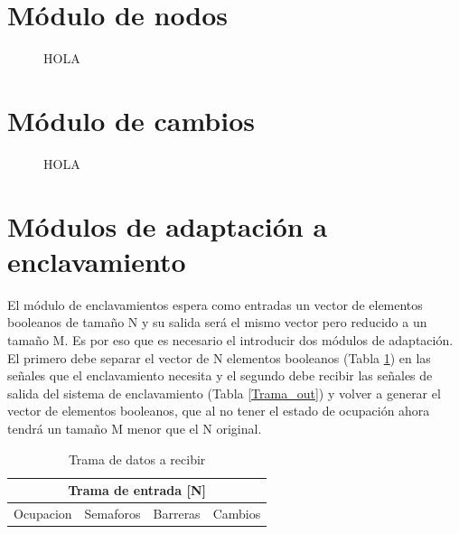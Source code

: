 \section{Módulo de nodos}

	\begin{figure}[h]
	\centering
		\caption{HOLA}
		\label{fig:hola}
	\end{figure}
	
\section{Módulo de cambios}

	\begin{figure}[h]
	\centering
		\caption{HOLA}
		\label{fig:hola}
	\end{figure}
	
%
	
\section{Módulos de adaptación a enclavamiento}

	El módulo de enclavamientos espera como entradas un vector de elementos booleanos de tamaño N y su salida será el mismo vector pero reducido a un tamaño M. Es por eso que es necesario el introducir dos módulos de adaptación. El primero debe separar el vector de N elementos booleanos (Tabla \ref{Trama_in}) en las señales que el enclavamiento necesita y el segundo debe recibir las señales de salida del sistema de enclavamiento (Tabla \ref{Trama_out}) y volver a generar el vector de elementos booleanos, que al no tener el estado de ocupación ahora tendrá un tamaño M menor que el N original. 
	 
	\begin{table}[!hbt]
	\renewcommand{\arraystretch}{1.3}
	\caption{Trama de datos a recibir}
	\label{Trama_in}
	\centering
	\begin{tabular}{| c | c | c | c |}
	\multicolumn{4}{c}{Trama de entrada [N]} \\
	\hline
	Ocupacion & Semaforos & Barreras & Cambios \\	
	\hline
	\end{tabular}
	\end{table}	 
	
